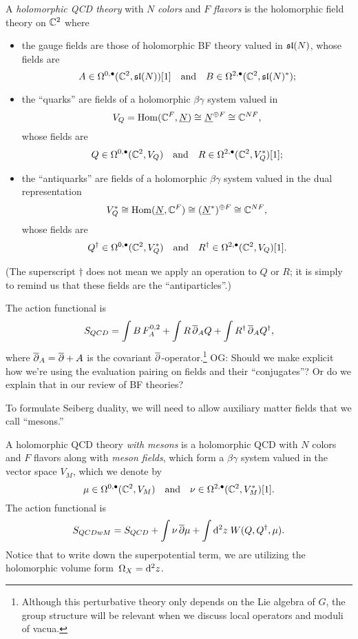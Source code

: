 \documentclass[11pt]{amsart}
\def\owen#1{{\textcolor{violet!65!black}{OG: {#1}}}}
\begin{document}
\begin{dfn}
A {\em holomorphic QCD theory} with $N$ {\em colors} and $F$ {\em flavors} is the holomorphic field theory on $\CC^2$ where
\begin{itemize}
\item the gauge fields are those of holomorphic BF theory valued in $\sl(N)$, whose fields are
\[
A \in \Omega^{0,\bu}(\CC^2 , \sl(N))[1] \quad\text{and}\quad B \in \Omega^{2,\bu}(\CC^2, \sl(N)^*);
\]
\item the ``quarks'' are fields of a holomorphic $\beta\gamma$ system valued in 
\[
V_Q = \Hom(\CC^F, \underline{N}) \cong \underline{N}^{\oplus F} \cong \CC^{NF},
\] 
whose fields are
\[
Q \in \Omega^{0,\bu}(\CC^2 , V_Q) \quad\text{and}\quad R \in \Omega^{2,\bu}(\CC^2 , V_Q^*)[1];
\]
\item the ``antiquarks'' are fields of a holomorphic $\beta\gamma$ system valued in the dual representation 
\[
V^*_Q \cong \Hom(\underline{N}, \CC^F) \cong (\underline{N}^*)^{\oplus F} \cong \CC^{NF}, 
\]
whose fields are
\[
Q^\dag \in \Omega^{0,\bu}(\CC^2 , V^*_Q) \quad\text{and}\quad R^\dag \in \Omega^{2,\bu}(\CC^2 , V_Q) [1].
\]
\end{itemize}
(The superscript $\dag$ does not mean we apply an operation to $Q$ or $R$; 
it is simply to remind us that these fields are the ``antiparticles''.)

The action functional is
\[
S_{QCD} = \int B\, F^{0,2}_A + \int R \,\dbar_A Q + \int R^\dag \,\dbar_A Q^\dag,
\]
where $\dbar_A = \dbar + A$ is the covariant $\dbar$-operator.\footnote{Although this perturbative theory only depends on the Lie algebra of $G$, the group structure will be relevant when we discuss local operators and moduli of vacua.}
\owen{Should we make explicit how we're using the evaluation pairing on fields and their ``conjugates''? Or do we explain that in our review of BF theories?}
\end{dfn}

To formulate Seiberg duality, we will need to allow auxiliary matter fields that we call ``mesons.''

\begin{dfn}
A holomorphic QCD theory {\em with mesons}
is a holomorphic QCD with $N$ colors and $F$ flavors along with {\em meson fields}, which form a $\beta\gamma$ system valued in the vector space $V_M$, which we denote by
\[
\mu \in \Omega^{0,\bu}(\CC^2 , V_M) \quad\text{and}\quad \nu \in \Omega^{2,\bu}(\CC^2 , V_M^*) [1] .
\]
The action functional is
\[
S_{QCDwM} = S_{QCD} + \int \nu \,\dbar \mu + \int \d^2 z \; W(Q, Q^\dag, \mu) .
\] 
Notice that to write down the superpotential term, we are utilizing the holomorphic volume form~$\Omega_X = \d^2 z$. 
\end{dfn}
\end{document}
